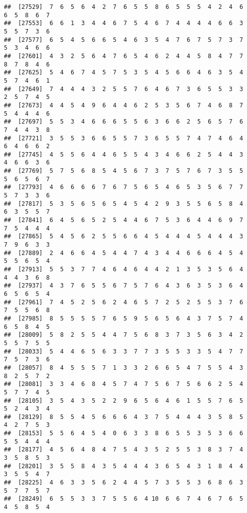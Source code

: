 \documentclass[
]{book}
\begin{document}
\begin{verbatim}
##  [27529]  7  6  5  6  4  2  7  6  5  5  8  6  5  5  5  4  2  4  6  6  5  8  6  7
##  [27553]  6  6  1  3  4  4  6  7  5  4  6  7  4  4  4  4  6  6  3  5  5  7  3  6
##  [27577]  6  5  4  5  6  6  5  4  6  3  5  4  7  6  7  5  7  3  7  5  3  4  6  6
##  [27601]  4  3  2  5  6  4  7  6  5  4  6  2  4  4  5  8  4  7  7  8  7  8  4  6
##  [27625]  5  4  6  7  4  5  7  5  3  5  4  5  6  6  4  6  3  5  4  5  7  4  6  1
##  [27649]  7  4  4  4  3  2  5  5  7  6  4  6  7  3  6  5  5  3  3  2  5  7  4  5
##  [27673]  4  4  5  4  9  6  4  4  6  2  5  3  5  6  7  4  6  8  7  5  4  4  4  6
##  [27697]  5  5  3  4  6  6  6  5  5  6  3  6  6  2  5  6  5  7  6  7  4  4  3  8
##  [27721]  3  5  5  3  6  6  5  5  7  3  6  5  5  7  4  7  4  6  4  6  4  6  6  2
##  [27745]  4  5  5  6  4  4  6  5  5  4  3  4  6  6  2  5  4  4  3  4  6  6  3  6
##  [27769]  5  7  5  6  8  5  4  5  6  7  3  7  5  7  6  7  3  5  5  5  6  5  6  7
##  [27793]  4  6  6  6  6  7  6  7  5  6  5  4  6  5  3  5  6  7  7  5  7  3  3  6
##  [27817]  5  3  5  6  5  6  5  4  5  4  2  9  3  5  5  6  5  8  4  6  3  5  5  7
##  [27841]  6  4  5  6  5  2  5  4  4  6  7  5  3  6  4  4  6  9  7  7  5  4  4  4
##  [27865]  5  4  5  6  2  5  5  6  6  4  5  4  4  4  5  4  4  4  3  7  9  6  3  3
##  [27889]  2  4  6  6  4  5  4  4  7  4  3  4  4  6  6  6  4  5  4  5  5  6  5  4
##  [27913]  5  5  3  7  7  4  6  4  6  4  4  2  1  3  5  3  5  6  4  4  4  3  6  8
##  [27937]  4  3  7  6  5  5  6  7  5  7  6  4  3  6  3  5  3  6  4  6  5  6  5  4
##  [27961]  7  4  5  2  5  6  2  4  6  5  7  2  5  2  5  5  3  7  6  7  5  5  6  8
##  [27985]  8  5  5  5  5  7  6  5  9  5  6  5  6  4  3  7  5  7  4  6  5  8  4  5
##  [28009]  5  8  2  5  5  4  4  7  5  6  8  3  7  3  5  6  3  4  2  5  5  7  5  5
##  [28033]  5  4  4  6  5  6  3  3  7  7  3  5  5  3  3  5  4  7  7  7  5  7  3  6
##  [28057]  8  4  5  5  5  7  1  3  3  2  6  6  5  4  7  5  5  4  3  8  2  5  7  2
##  [28081]  3  3  4  6  8  4  5  7  4  7  5  6  7  5  6  6  2  5  4  5  7  7  4  5
##  [28105]  3  5  4  3  5  2  2  9  6  5  6  4  6  1  5  5  7  6  5  5  2  4  3  4
##  [28129]  8  5  5  4  5  6  6  6  4  3  7  5  4  4  4  3  5  8  5  4  2  7  5  3
##  [28153]  5  5  6  4  5  4  0  6  3  3  8  6  5  5  3  5  3  6  6  5  5  4  4  4
##  [28177]  4  5  6  4  8  4  7  5  4  3  5  2  5  5  3  8  3  7  4  3  5  8  5  3
##  [28201]  3  5  5  8  4  3  5  4  4  4  3  6  5  4  3  1  8  4  4  3  5  5  4  7
##  [28225]  4  6  3  3  5  6  2  4  4  5  7  3  5  5  3  6  8  6  3  5  7  7  5  7
##  [28249]  6  5  5  3  3  7  5  5  6  4 10  6  6  7  4  6  7  6  5  4  5  8  5  4

\end{verbatim}
\end{document}
